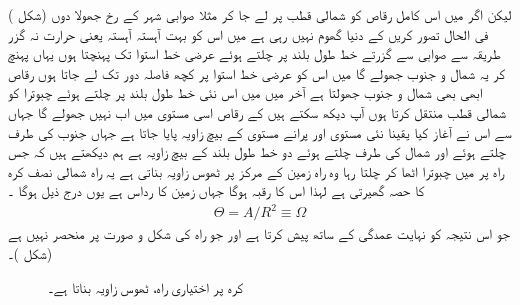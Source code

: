  لیکن اگر میں اس کامل  رقاص  کو شمالی قطب پر لے جا کر مثلا صوابی شہر کے رخ جھولا دوں  (شکل ) فی الحال تصور کریں کے دنیا گھوم نہیں رہی ہے میں اس کو بہت آہستہ آہستہ یعنی حرارت نہ گزر طریقہ سے صوابی سے گزرتے خط طول بلند پر چلتے ہوئے عرضی خط استوا تک پہنچتا ہوں یہاں پہنچ کر یہ شمال و جنوب جھولے گا میں اس کو عرضی خط استوا پر کچھ فاصلہ دور تک لے جاتا ہوں  رقاص  ابھی بھی شمال و جنوب جھولتا ہے آخر میں میں اس نئی خط طول بلند پر چلتے ہوئے چبوترا کو شمالی قطب منتقل کرتا ہوں آپ دیکھ سکتے ہیں کے  رقاص  اسی مستوی میں اب نہیں جھولے گا جہاں سے اس نے آغاز کیا یقینا نئی مستوی اور پرانے مستوی کے بیچ زاویہ  پایا جاتا ہے جہاں جنوب کی طرف چلتے ہوئے اور شمال کی طرف چلتے ہوئے دو خط طول بلند کے بیچ زاویہ  ہے ہم دیکھتے ہیں کہ جس راہ پر میں چبوترا اٹھا کر چلتا رہا وہ راہ زمین کے مرکز پر ٹھوس زاویہ  بناتی ہے یہ راہ شمالی نصف کرہ کا  حصہ گھیرتی ہے لہذا اس کا رقبہ  ہوگا جہاں  زمین کا رداس ہے یوں درج ذیل ہوگا ۔
\begin{align}
\Theta = A/R^2 \equiv \Omega
\end{align}
جو اس نتیجہ کو نہایت عمدگی کے ساتھ پیش کرتا ہے اور جو راہ کی شکل و صورت پر منحصر نہیں ہے  (شکل )۔

\begin{figure}
\centering
{}
\caption{کرہ پر اختیاری راہ، ٹھوس زاویہ  بناتا ہے۔}
\label{شکل_حرارت_نا_گزر_کرہ_پر_ٹھوس_زاویہ}
\end{figure}


